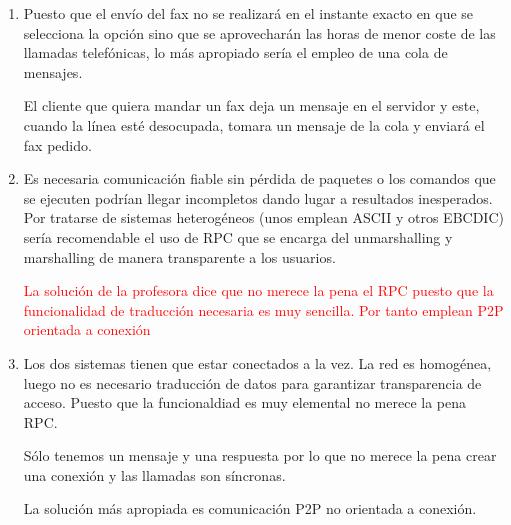 \begin{problem}[14]
\begin{enumerate}
    \item

    Puesto que el envío del fax no se realizará en el instante exacto en que se selecciona la opción sino que se aprovecharán las horas de menor coste de las llamadas telefónicas, lo más apropiado sería el empleo de una cola de mensajes.

    El cliente que quiera mandar un fax deja un mensaje en el servidor y este, cuando la línea esté desocupada, tomara un mensaje de la cola y enviará el fax pedido.

    \item

    Es necesaria comunicación fiable sin pérdida de paquetes o los comandos que se ejecuten podrían llegar incompletos dando lugar a resultados inesperados. Por tratarse de sistemas heterogéneos (unos emplean ASCII y otros EBCDIC) sería recomendable el uso de RPC que se encarga del unmarshalling y marshalling de manera transparente a los usuarios.

    \textcolor{red}{La solución de la profesora dice que no merece la pena el RPC puesto que la funcionalidad de traducción necesaria es muy sencilla. Por tanto emplean P2P orientada a conexión}

    \item

   Los dos sistemas tienen que estar conectados a la vez. La red es homogénea, luego no es necesario traducción de datos para garantizar transparencia de acceso.
   Puesto que la funcionaldiad es muy elemental no merece la pena RPC.

   Sólo tenemos un mensaje y una respuesta por lo que no merece la pena crear
   una conexión y las llamadas son síncronas.

  La solución más apropiada es comunicación P2P no orientada a conexión.

    \end{enumerate}

    \end{problem}



